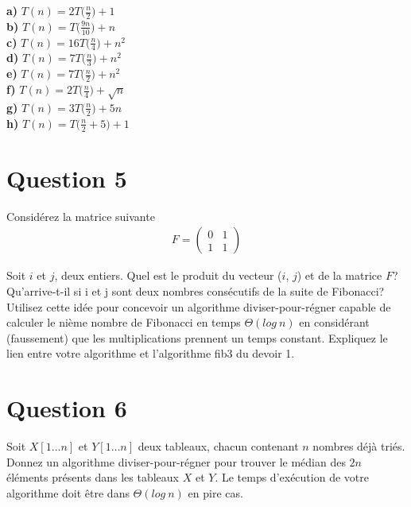 \documentclass[12pt]{article}
\begin{document}
\textbf{a) } \(T(n)=2T\big(\frac{n}{2}\big)+1\) \\

\textbf{b) } \(T(n)=T\big(\frac{9n}{10}\big)+n\) \\

\textbf{c) } \(T(n)=16T\big(\frac{n}{4}\big)+n^2\) \\

\textbf{d) } \(T(n)=7T\big(\frac{n}{3}\big)+n^2\) \\

\textbf{e) } \(T(n)=7T\big(\frac{n}{2}\big)+n^2\) \\

\textbf{f) } \(T(n)=2T\big(\frac{n}{4}\big)+\sqrt{n}\) \\

\textbf{g) } \(T(n)=3T\big(\frac{n}{2}\big)+5n\) \\

\textbf{h) } \(T(n)=T\big(\frac{n}{2}+5\big)+1\) \\

\newpage

\section*{Question 5}
Considérez la matrice suivante
\begin{align*}
	F = 
	\begin{pmatrix}
		0 & 1 \\
		1 & 1 
	\end{pmatrix}
\end{align*}

Soit \(i\) et \(j\), deux entiers. Quel est le produit du vecteur (\(i\), \(j\)) et de la matrice \(F\)? Qu’arrive-t-il si i et j sont deux nombres consécutifs de la suite de Fibonacci? Utilisez cette idée pour concevoir un algorithme diviser-pour-régner capable de calculer le nième nombre de Fibonacci en temps \(\Theta (log \: n)\) en considérant (faussement) que les multiplications
prennent un temps constant. Expliquez le lien entre votre algorithme et l’algorithme fib3 du devoir 1.

\newpage

\section*{Question 6}
Soit \(X[1 \dots n]\) et \(Y [1 \dots n]\) deux tableaux, chacun contenant \(n\) nombres déjà triés. Donnez un algorithme diviser-pour-régner pour trouver le médian des \(2n\) éléments présents dans les tableaux \(X\) et \(Y\). Le temps d’exécution de votre algorithme doit être dans \(\Theta (log \: n)\) en pire cas.
\end{document}
